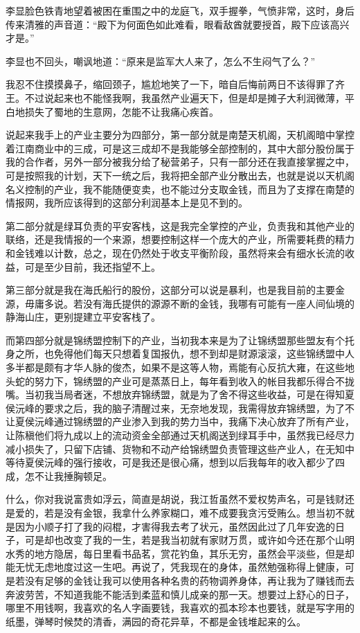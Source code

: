 李显脸色铁青地望着被困在重围之中的龙庭飞，双手握拳，气愤非常，这时，身后传来清雅的声音道：“殿下为何面色如此难看，眼看敌酋就要授首，殿下应该高兴才是。”

李显也不回头，嘲讽地道：“原来是监军大人来了，怎么不生闷气了么？”

我忍不住摸摸鼻子，缩回颈子，尴尬地笑了一下，暗自后悔前两日不该得罪了齐王。不过说起来也不能怪我啊，我虽然产业遍天下，但是却是摊子大利润微薄，平白地损失了蜀地的生意网，怎能不让我痛心疾首。

说起来我手上的产业主要分为四部分，第一部分就是南楚天机阁，天机阁暗中掌控着江南商业中的三成，可是这三成却不是我能够全部控制的，其中大部分股份属于我的合作者，另外一部分被我分给了秘营弟子，只有一部分还在我直接掌握之中，可是按照我的计划，天下一统之后，我将把全部产业分散出去，也就是说以天机阁名义控制的产业，我不能随便变卖，也不能过分支取金钱，而且为了支撑在南楚的情报网，我所应该得到的这部分利润基本上是见不到的。

第二部分就是绿耳负责的平安客栈，这是我完全掌控的产业，负责我和其他产业的联络，还是我情报的一个来源，想要控制这样一个庞大的产业，所需要耗费的精力和金钱难以计数，总之，现在仍然处于收支平衡阶段，虽然将来会有细水长流的收益，可是至少目前，我还指望不上。

第三部分就是我在海氏船行的股份，这部分可以说是暴利，也是我目前的主要金源，毋庸多说。若没有海氏提供的源源不断的金钱，我哪有可能有一座人间仙境的静海山庄，更别提建立平安客栈了。

而第四部分就是锦绣盟控制下的产业，当初我本来是为了让锦绣盟那些盟友有个托身之所，也免得他们每天只想着复国报仇，想不到却是财源滚滚，这些锦绣盟中人多半都是颇有才华人脉的俊杰，如果不是这等人物，焉能有心反抗大雍，在这些地头蛇的努力下，锦绣盟的产业可是蒸蒸日上，每年看到收入的帐目我都乐得合不拢嘴。当初我当局者迷，不想放弃锦绣盟，就是为了舍不得这些收益，可是在得知夏侯沅峰的要求之后，我的脑子清醒过来，无奈地发现，我需得放弃锦绣盟，为了不让夏侯沅峰通过锦绣盟的产业渗入到我的势力当中，我痛下决心放弃了所有产业，让陈稹他们将九成以上的流动资金全部通过天机阁送到绿耳手中，虽然我已经尽力减小损失了，只留下店铺、货物和不动产给锦绣盟负责管理这些产业人，在无知中等待夏侯沅峰的强行接收，可是我还是很心痛，想到以后我每年的收入都少了四成，怎不让我捶胸顿足。

什么，你对我说富贵如浮云，简直是胡说，我江哲虽然不爱权势声名，可是钱财还是爱的，若是没有金银，我拿什么养家糊口，难不成要我贪污受贿么。想当初不就是因为小顺子打了我的闷棍，才害得我去考了状元，虽然因此过了几年安逸的日子，可是却也改变了我的一生，若是我当初就有家财万贯，或许如今还在那个山明水秀的地方隐居，每日里看书品茗，赏花钓鱼，其乐无穷，虽然会平淡些，但是却能无忧无虑地度过这一生吧。再说了，凭我现在的身体，虽然勉强称得上健康，可是若没有足够的金钱让我可以使用各种名贵的药物调养身体，再让我为了赚钱而去奔波劳苦，不知道我能不能活到柔蓝和慎儿成亲的那一天。想要过上舒心的日子，哪里不用钱啊，我喜欢的名人字画要钱，我喜欢的孤本珍本也要钱，就是写字用的纸墨，弹琴时候焚的清香，满园的奇花异草，不都是金钱堆起来的么。


